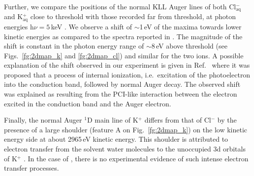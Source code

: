 Further, we compare the positions of the normal KLL Auger lines of both Cl$^{-}_{\text{aq}}$ and K$^{+}_{\text{aq}}$ close to threshold with those recorded far from threshold, at photon energies h$\nu = 5$\,keV \citep{ceolin17:263003}. 
We observe a shift of $\sim$1\,eV of the maxima towards lower kinetic energies as compared to the spectra reported in \citep{ceolin17:263003}. The magnitude of the shift is constant in the photon energy range of $\sim$8\,eV above threshold (see Figs.\ \ref{fg:2dmap_k} and \ref{fg:2dmap_cl}) and similar for the two ions. %
A possible explanation of the shift observed in our experiment is given in Ref.\ \cite{tchaplyguine07:124314} where it was proposed that a process of internal ionization, i.e.\ excitation of the photoelectron into the conduction band, followed by normal Auger decay. The observed shift was explained as resulting from the PCI-like interaction between the electron excited in the conduction band and the Auger electron.


Finally, the normal Auger $^1$D main line of K$^{+}$ differs from that of Cl$^{-}$ by the presence of a large shoulder (feature A on Fig.\ \ref{fg:2dmap_k}) on the low kinetic energy side at about 2965\,eV kinetic energy. This shoulder is attributed to electron transfer from the solvent water molecules to the unoccupied 3d orbitals of K$^{+}$ \citep{ceolin17:263003}. In the case of \cli, there is no experimental evidence of such intense electron transfer processes.


